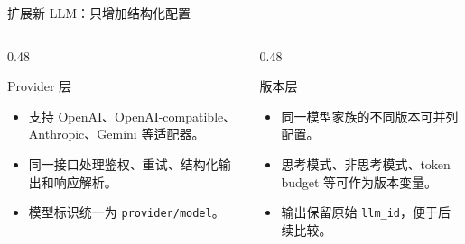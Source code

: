 \begin{frame}{扩展新 LLM：只增加结构化配置}
  \begin{columns}[T,totalwidth=\textwidth]
    \begin{column}{0.48\textwidth}
      \begin{block}{Provider 层}
        \begin{itemize}
          \item 支持 OpenAI、OpenAI-compatible、Anthropic、Gemini 等适配器。
          \item 同一接口处理鉴权、重试、结构化输出和响应解析。
          \item 模型标识统一为 \texttt{provider/model}。
        \end{itemize}
      \end{block}
    \end{column}
    \begin{column}{0.48\textwidth}
      \begin{block}{版本层}
        \begin{itemize}
          \item 同一模型家族的不同版本可并列配置。
          \item 思考模式、非思考模式、token budget 等可作为版本变量。
          \item 输出保留原始 \texttt{llm\_id}，便于后续比较。
        \end{itemize}
      \end{block}
    \end{column}
  \end{columns}

  \vspace{0.6em}
\end{frame}

